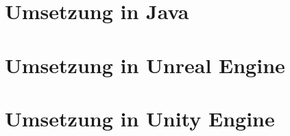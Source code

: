 \documentclass[
	12pt, %
	a4paper,
	listof=totoc, %
	bibliography=totoc, %
	numbers=noenddot, %
	ngerman, %
	headsepline, %
	oneside %
	]{scrbook} %
\begin{document}
\section{Umsetzung in Java}

\section{Umsetzung in Unreal Engine}

\section{Umsetzung in Unity Engine}

%
%
%
\end{document}
